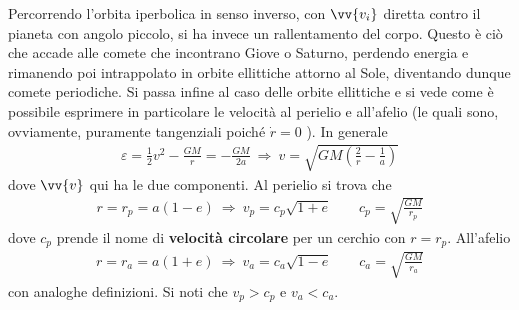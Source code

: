 \documentclass[a4paper, oneside]{book}
\begin{document}
Percorrendo l'orbita iperbolica in senso inverso, con $\vv{v_i}$ diretta contro il pianeta
con angolo piccolo, si ha invece un rallentamento del corpo. Questo 
è ciò che accade alle comete che incontrano Giove o Saturno, perdendo energia e rimanendo 
poi intrappolato in orbite ellittiche attorno al Sole, diventando dunque 
comete periodiche.  
Si passa infine al caso delle orbite ellittiche e si vede come è 
possibile esprimere in particolare le velocità al perielio e all'afelio 
(le quali sono, ovviamente, puramente tangenziali poiché $\dot{r} = 0$ ).
In generale 
\begin{gather*}
    \varepsilon = \frac{1}{2}v^{2} - \frac{GM}{r} = -\frac{GM}{2a} \ \Longrightarrow \ v = \sqrt{GM\left(\frac{2}{r} - \frac{1}{a}\right)} 
\end{gather*} 
dove $\vv{v}$ qui ha le due componenti. Al perielio si trova che
\begin{gather*}
    r = r_p = a(1 - e) \ \Longrightarrow \ v_p = c_p\sqrt{1 + e}  \qquad c_p = \sqrt{\frac{GM}{r_p}}  
\end{gather*} 
dove $c_p$ prende il nome di \textbf{velocità circolare} per un cerchio con $r = r_p$.  
All'afelio
\begin{gather*}
    r = r_a = a(1 + e) \ \Longrightarrow \ v_a = c_a\sqrt{1 - e}\qquad c_a = \sqrt{\frac{GM}{r_a}}  
\end{gather*}
con analoghe definizioni. Si noti che $v_p > c_p$ e $v_a < c_a$.

\clearpage
\end{document}
